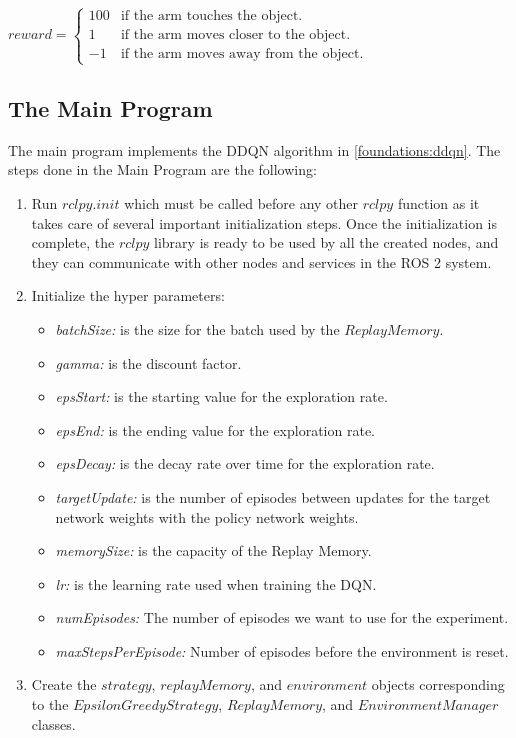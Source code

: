 \documentclass[12pt,oneside]{article}
\begin{document}
\begin{enumerate}
$reward = 
 \begin{cases} 
 	100 	& \text{if the arm touches the object.} \\ 
 	1 		& \text{if the arm moves closer to the object.} \\ 
 	-1 		& \text{if the arm moves away from the object.} 
 \end{cases}$
\end{enumerate}


\subsection{The Main Program}\label{main-program}
The main program implements the DDQN algorithm in \ref{foundations:ddqn}. The steps done in the Main Program are the following:
\begin{enumerate}
\item Run $rclpy.init$ which must be called before any other $rclpy$ function as it takes care of several important initialization steps. Once the initialization is complete, the $rclpy$ library is ready to be used by all the created nodes, and they can communicate with other nodes and services in the ROS 2 system.
\item  Initialize the hyper parameters:
\begin{itemize}
\item \textit{batchSize:} is the size for the batch used by the $ReplayMemory$.
\item \textit{gamma:} is the discount factor.
\item \textit{epsStart:} is the starting value for the exploration rate.
\item \textit{epsEnd: } is the ending value for the exploration rate.
\item \textit{epsDecay:} is the decay rate over time for the exploration rate.
\item \textit{targetUpdate:} is the number of episodes between updates for the target network weights with the policy network weights.
\item \textit{memorySize:} is the capacity of the Replay Memory.
\item \textit{lr:} is the learning rate used when training the DQN.
\item \textit{numEpisodes:} The number of episodes we want to use for the experiment.
\item \textit{maxStepsPerEpisode:} Number of episodes before the environment is reset.
\end{itemize}
\item Create the $strategy$, $replayMemory$, and $environment$ objects corresponding to the $EpsilonGreedyStrategy$, $ReplayMemory$, and $EnvironmentManager$ classes.

\end{enumerate}
\end{document}
